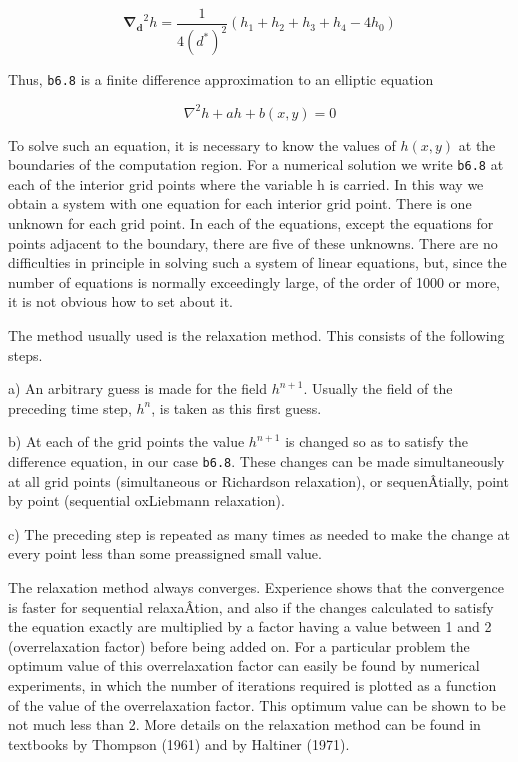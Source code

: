 {\[\mathbf{\nabla_d}^2 h = \frac{1}{4(d^*)^2}\left( h_{1} + h_{2} + h_{3} + h_{4} - 4h_{0} \right)\]}

Thus, \texttt{b6.8} is a finite difference approximation to an elliptic
equation

\[\nabla^{2}h + ah + b\left( x,y \right) = 0\]

To solve such an equation, it is necessary to know the values of
\(h(x,y)\) at the boundaries of the computation region. For a numerical
solution we write \texttt{b6.8} at each of the interior grid points
where the variable h is carried. In this way we obtain a system with one
equation for each interior grid point. There is one unknown for each
grid point. In each of the equations, except the equations for points
adjacent to the boundary, there are five of these unknowns. There are no
difficulties in principle in solving such a system of linear equations,
but, since the number of equations is normally exceedingly large, of the
order of 1000 or more, it is not obvious how to set about it.

The method usually used is the relaxation method. This consists of the
following steps.

a) An arbitrary guess is made for the field \(h^{n + 1}\). Usually the
field of the preceding time step, \(h^{n}\), is taken as this first
guess.

b) At each of the grid points the value \(h^{n + 1}\) is changed so as
to satisfy the difference equation, in our case \texttt{b6.8}. These
changes can be made simultaneously at all grid points (simultaneous or
Richardson relaxation), or sequenÂ­tially, point by point (sequential
oxLiebmann relaxation).

c) The preceding step is repeated as many times as needed to make the
change at every point less than some preassigned small value.

The relaxation method always converges. Experience shows that the
convergence is faster for sequential relaxaÂ­tion, and also if the
changes calculated to satisfy the equation exactly are multiplied by a
factor having a value between 1 and 2 (overrelaxation factor) before
being added on. For a particular problem the optimum value of this
overrelaxation factor can easily be found by numerical experiments, in
which the number of iterations required is plotted as a function of the
value of the overrelaxation factor. This optimum value can be shown to
be not much less than 2. More details on the relaxation method can be
found in textbooks by Thompson (1961) and by Haltiner (1971).

